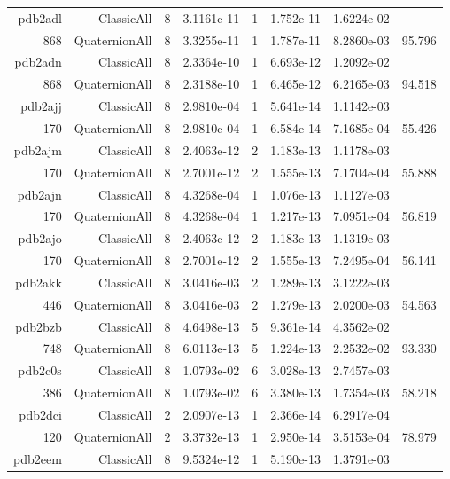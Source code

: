 \begin{xltabular}{\textwidth}{r|rcS[table-format=1.4e+2]cS[table-format=1.3e+2]S[table-format=1.4e+2]S[table-format=-1.3]}
pdb2adl & ClassicAll & 8 & 3.1161e-11 & 1 & 1.752e-11 & 1.6224e-02 & \\
868 & QuaternionAll & 8 & 3.3255e-11 & 1 & 1.787e-11 & 8.2860e-03 & 95.796\\  \addlinespace
pdb2adn & ClassicAll & 8 & 2.3364e-10 & 1 & 6.693e-12 & 1.2092e-02 & \\
868 & QuaternionAll & 8 & 2.3188e-10 & 1 & 6.465e-12 & 6.2165e-03 & 94.518\\  \addlinespace
pdb2ajj & ClassicAll & 8 & 2.9810e-04 & 1 & 5.641e-14 & 1.1142e-03 & \\
170 & QuaternionAll & 8 & 2.9810e-04 & 1 & 6.584e-14 & 7.1685e-04 & 55.426\\  \addlinespace
pdb2ajm & ClassicAll & 8 & 2.4063e-12 & 2 & 1.183e-13 & 1.1178e-03 & \\
170 & QuaternionAll & 8 & 2.7001e-12 & 2 & 1.555e-13 & 7.1704e-04 & 55.888\\  \addlinespace
pdb2ajn & ClassicAll & 8 & 4.3268e-04 & 1 & 1.076e-13 & 1.1127e-03 & \\
170 & QuaternionAll & 8 & 4.3268e-04 & 1 & 1.217e-13 & 7.0951e-04 & 56.819\\  \addlinespace
pdb2ajo & ClassicAll & 8 & 2.4063e-12 & 2 & 1.183e-13 & 1.1319e-03 & \\
170 & QuaternionAll & 8 & 2.7001e-12 & 2 & 1.555e-13 & 7.2495e-04 & 56.141\\  \addlinespace
pdb2akk & ClassicAll & 8 & 3.0416e-03 & 2 & 1.289e-13 & 3.1222e-03 & \\
446 & QuaternionAll & 8 & 3.0416e-03 & 2 & 1.279e-13 & 2.0200e-03 & 54.563\\  \addlinespace
pdb2bzb & ClassicAll & 8 & 4.6498e-13 & 5 & 9.361e-14 & 4.3562e-02 & \\
748 & QuaternionAll & 8 & 6.0113e-13 & 5 & 1.224e-13 & 2.2532e-02 & 93.330\\  \addlinespace
pdb2c0s & ClassicAll & 8 & 1.0793e-02 & 6 & 3.028e-13 & 2.7457e-03 & \\
386 & QuaternionAll & 8 & 1.0793e-02 & 6 & 3.380e-13 & 1.7354e-03 & 58.218\\  \addlinespace
pdb2dci & ClassicAll & 2 & 2.0907e-13 & 1 & 2.366e-14 & 6.2917e-04 & \\
120 & QuaternionAll & 2 & 3.3732e-13 & 1 & 2.950e-14 & 3.5153e-04 & 78.979\\  \addlinespace
pdb2eem & ClassicAll & 8 & 9.5324e-12 & 1 & 5.190e-13 & 1.3791e-03 & \\

\end{xltabular}

